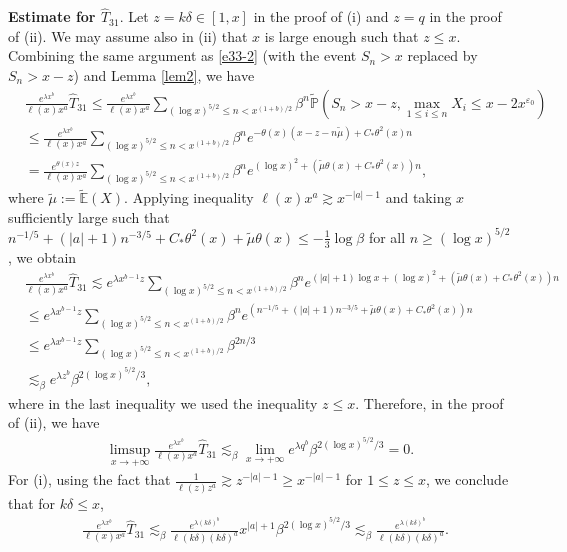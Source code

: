 \documentclass[11pt]{article}
\numberwithin{equation}{section}
\begin{document}
\noindent
{\bf Estimate for $\widehat{T}_{31}$}. Let $z= k\delta \in [1,x]$ in the proof of (i) and $z=q$ in the proof of (ii). We may assume also in (ii) that $x$ is large enough such that $z\leq x$. 
Combining the same argument as \eqref{e33-2} (with the event $S_n>x$ replaced by $S_n>x-z$) and Lemma  \ref{lem2}, we have 
\begin{align}
	& \frac{e^{\lambda x^b}}{\ell(x)x^a } \widehat{T}_{31} \leq \frac{e^{\lambda x^b}}{\ell(x)x^a } \sum_{(\log x)^{5/2}\leq n<x^{(1+b)/2}}  \beta^{n}\widetilde{\mathbb{P}}\left( S_n> x-z, \max_{1\leq i\leq n} X_i \leq x-2x^{\varepsilon_0}\right) \nonumber\\
	& \leq \frac{e^{\lambda x^b}}{\ell(x)x^a } \sum_{(\log x)^{5/2}\leq n<x^{(1+b)/2}}  \beta^{n} e^{-\theta(x)(x-z -n\widetilde{\mu})+C_*\theta^2(x)n} \nonumber\\
	& = \frac{e^{\theta(x)z}}{\ell(x)x^a } \sum_{(\log x)^{5/2}\leq n<x^{(1+b)/2}}  \beta^{n} e^{ (\log x)^2+ (\widetilde{\mu} \theta(x)+C_*\theta^2(x))n} ,
\end{align}
where $\widetilde{\mu}:= \widetilde{\mathbb{E}}(X)$. Applying inequality $\ell (x) x^{a}\gtrsim x^{-|a|-1}$ and  taking $x$
sufficiently large such that 
$n^{-1/5}+ (|a|+1)n^{-3/5}+ C_*\theta^2(x)+\widetilde{\mu} \theta(x)\leq -\frac{1}{3}\log \beta$ for all $n\geq  (\log x)^{5/2}$,  we obtain 
\begin{align}\label{e26-1}
	& \frac{e^{\lambda x^b}}{\ell(x)x^a } \widehat{T}_{31} \lesssim e^{ \lambda x^{b-1}z}  \sum_{(\log x)^{5/2}\leq n<x^{(1+b)/2}}  \beta^{n} e^{ (|a|+1)\log x+ (\log x)^2+ (\widetilde{\mu} \theta(x)+C_*\theta^2(x))n} \nonumber\\
	& \leq e^{ \lambda x^{b-1}z}  \sum_{(\log x)^{5/2}\leq n<x^{(1+b)/2}}  \beta^{n} e^{  (n^{-1/5}+(|a|+1)n^{-3/5}+\widetilde{\mu} \theta(x)+C_*\theta^2(x))n} \nonumber\\
	& \leq e^{ \lambda x^{b-1}z}  \sum_{(\log x)^{5/2}\leq n<x^{(1+b)/2}}  \beta^{2n/3} \nonumber\\
	&\lesssim_\beta  e^{ \lambda  z^b } \beta ^{2(\log x)^{5/2}/3},
\end{align}
where in the last inequality we used the inequality $z\leq x$.
Therefore, in the proof of (ii), we have 
\begin{align}\label{e26-2'}
	\limsup_{x\to+\infty}   \frac{e^{\lambda x^b}}{\ell(x)x^a } \widehat{T}_{31} \lesssim_\beta  \lim_{x\to+\infty}  e^{ \lambda  q^b } \beta ^{2(\log x)^{5/2}/3}=0.
\end{align}
For (i), using the fact  that $\frac{1}{\ell(z) z^a}\gtrsim z^{-|a|-1}\geq x^{-|a|-1}$ for $1\leq z \leq x$, we conclude that for $k\delta \leq x $,
\begin{align}\label{e26-2}
	& \frac{e^{\lambda x^b}}{\ell(x)x^a } \widehat{T}_{31} \lesssim_\beta \frac{e^{ \lambda (k\delta)^{b}  }}{\ell(k\delta)(k\delta)^a} x^{|a|+1} \beta ^{2(\log x)^{5/2}/3} \lesssim_\beta  \frac{e^{ \lambda (k\delta)^{b}  }}{\ell(k\delta)(k\delta)^a} .
\end{align}
\end{document}
